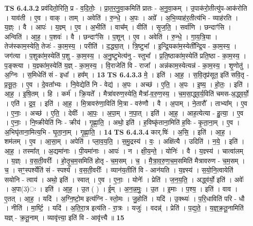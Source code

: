 \documentclass[17pt]{extarticle}
\begin{document}
                  \newline
                                \textbf{ TS 6.4.3.2} \newline
                  प्रव॑दितो॒रिति॒ प्र - व॒दि॒तोः॒ । प्रा॒त॒र॒नु॒वा॒कमिति॑ प्रातः - अ॒नु॒वा॒कम् । उ॒पाक॑रो॒तीत्यु॑प-आक॑रोति । याव॑ती । ए॒व । वाक् । ताम् । अवेति॑ । रु॒न्धे॒ । अ॒पः । अग्रे᳚ । अ॒भि॒व्याह॑र॒तीत्य॑भि - व्याह॑रति । य॒ज्ञ्ः । वै । आपः॑ । य॒ज्ञ्म् । ए॒व । अ॒भीति॑ । वाच᳚म् । वीति॑ । सृ॒ज॒ति॒ । सर्वा॑णि । छन्दाꣳ॑सि । अन्विति॑ । आ॒ह॒ । प॒शवः॑ । वै । छन्दाꣳ॑सि । प॒शून् । ए॒व । अवेति॑ । रु॒न्धे॒ । गा॒य॒त्रि॒या । तेज॑स्काम॒स्येति॒ तेजः॑ - का॒म॒स्य॒ । परीति॑ । द॒द्ध्या॒त् । त्रि॒ष्टुभा᳚ । इ॒न्द्रि॒यका॑म॒स्येती᳚न्द्रि॒य - का॒म॒स्य॒ । जग॑त्या । प॒शुका॑म॒स्येति॑ प॒शु - का॒म॒स्य॒ । अ॒नु॒ष्टुभेत्य॑नु - स्तुभा᳚ । प्र॒ति॒ष्ठाका॑म॒स्येति॑ प्रति॒ष्ठा - का॒म॒स्य॒ । प॒ङ्क्त्या । य॒ज्ञ्का॑म॒स्येति॑ य॒ज्ञ् - का॒म॒स्य॒ । वि॒राजेति॑ वि - राजा᳚ । अन्न॑काम॒स्येत्यन्न॑ - का॒म॒स्य॒ । शृ॒णोतु॑ । अ॒ग्निः । स॒मिधेति॑ सं - इधा᳚ । हव᳚म् । \textbf{  13} \newline
                  \newline
                                \textbf{ TS 6.4.3.3} \newline
                  मे॒ । इति॑ । आ॒ह॒ । स॒वि॒तृप्र॑सूत॒ इति॑ सवि॒तृ - प्र॒सू॒तः॒ । ए॒व । दे॒वता᳚भ्यः । नि॒वेद्येति॑ नि - वेद्य॑ । अ॒पः । अच्छ॑ । ए॒ति॒ । अ॒पः । इ॒ष्य॒ । हो॒तः॒ । इति॑ । आ॒ह॒ । इ॒षि॒तम् । हि । कर्म॑ । क्रि॒यते᳚ । मैत्रा॑वरुण॒स्येति॒ मैत्रा᳚-व॒रु॒ण॒स्य॒ । च॒म॒सा॒द्ध्व॒र्य॒विति॑ चमस-अ॒द्ध्व॒र्यो॒ । एति॑ । द्र॒व॒ । इति॑ । आ॒ह॒ । मि॒त्रावरु॑णा॒विति॑ मि॒त्रा - वरु॑णौ । वै । अ॒पाम् । ने॒तारौ᳚ । ताभ्या᳚म् । ए॒व । ए॒नाः॒ । अच्छ॑ । ए॒ति॒ । देवीः᳚ । आ॒पः॒ । अ॒पा॒म् । न॒पा॒त् । इति॑ । आ॒ह॒ । आह॒त्येत्या - हु॒त्या॒ । ए॒व । ए॒नाः॒ । नि॒ष्क्रीयेति॑ निः - क्रीय॑ । गृ॒ह्णा॒ति॒ । अथो॒ इति॑ । ह॒विष्कृ॑ताना॒मिति॑ ह॒विः - कृ॒ता॒ना॒म् । ए॒व । अ॒भिघृ॑ताना॒मित्य॒भि - घृ॒ता॒ना॒म् । गृ॒ह्णा॒ति॒ । \textbf{  14} \newline
                  \newline
                                \textbf{ TS 6.4.3.4} \newline
                  कार्.षिः॑ । अ॒सि॒ । इति॑ । आ॒ह॒ । शम॑लम् । ए॒व । आ॒सा॒म् । अपेति॑ । प्ला॒व॒य॒ति॒ । स॒मु॒द्रस्य॑ । वः॒ । अक्षि॑त्यै । उदिति॑ । न॒ये॒ । इति॑ । आ॒ह॒ । तस्मा᳚त् । अ॒द्यमा॑नाः । पी॒यमा॑नाः । आपः॑ । न । क्षी॒य॒न्ते॒ । योनिः॑ । वै । य॒ज्ञ्स्य॑ । चात्वा॑लम् । य॒ज्ञ्ः । व॒स॒ती॒वरीः᳚ । हो॒तृ॒च॒म॒समिति॑ होतृ - च॒म॒सम् । च॒ । मै॒त्रा॒व॒रु॒ण॒च॒म॒समिति॑ मैत्रावरुण - च॒म॒सम् । च॒ । सꣳ॒॒स्पर्श्येति॑ सं - स्पर्श्य॑ । व॒स॒ती॒वरीः᳚ । व्यान॑य॒तीति॑ वि - आन॑यति । य॒ज्ञ्स्य॑ । स॒यो॒नि॒त्वायेति॑ सयोनि - त्वाय॑ । अथो॒ इति॑ । स्वात् । ए॒व । ए॒नाः॒ । योनेः᳚ । प्रेति॑ । ज॒न॒य॒ति॒ । अद्ध्व॑र्यो॒ इति॑ । अवेः᳚ । अ॒पा(3)ः । इति॑ । आ॒ह॒ । उ॒त ( ) । ई॒म् । अ॒न॒न्न॒मुः॒ । उ॒त । इ॒माः । प॒श्य॒ । इति॑ । वाव । ए॒तत् । आ॒ह॒ । यदि॑ । अ॒ग्नि॒ष्टो॒म इत्य॑ग्नि - स्तो॒मः । जु॒होति॑ । यदि॑ । उ॒क्थ्यः॑ । प॒रि॒धाविति॑ परि - धौ । नीति॑ । मा॒र्ष्टि॒ । यदि॑ । अ॒ति॒रा॒त्र इत्य॑ति - रा॒त्रः । यजुः॑ । वदन्न्॑ । प्रेति॑ । प॒द्य॒ते॒ । य॒ज्ञ्॒क्र॒तू॒नामिति॑ यज्ञ् - क्र॒तू॒नाम् । व्यावृ॑त्त्या॒ इति॑ वि - आवृ॑त्त्यै ॥ \textbf{  15 } \newline
\end{document}
